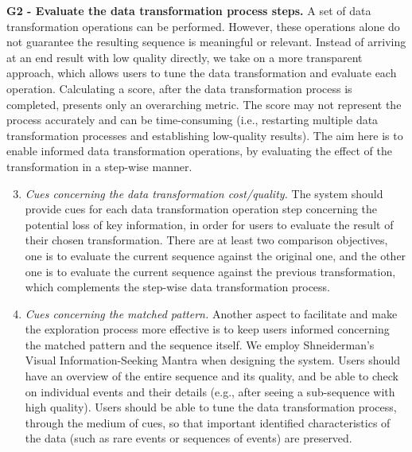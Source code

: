 \documentclass[camera]{vgtc}                          %
\begin{document}
\vspace{-4pt}
\noindent
\textbf{G2 - Evaluate the data transformation process steps.} A set of data transformation operations can be performed. However, these operations alone do not guarantee the resulting sequence is meaningful or relevant.
Instead of arriving at an end result with low quality directly, we take on a more transparent approach, which allows users to tune the data transformation and evaluate each operation. Calculating a score, after the data transformation process is completed, presents only an overarching metric. The score may not represent the process accurately and can be time-consuming (i.e., restarting multiple data transformation processes and establishing low-quality results). The aim here is to enable informed data transformation operations, by evaluating the effect of the transformation in a step-wise manner.
\begin{enumerate}
    \setcounter{enumi}{2}
    \itemsep0em
    \vspace{-4pt}
    \item \textit{Cues concerning the data transformation cost/quality.} The system should provide cues for each data transformation operation step concerning the potential loss of key information, in order for users to evaluate the result of their chosen transformation. There are at least two comparison objectives, one is to evaluate the current sequence against the original one, and the other one is to evaluate the current sequence against the previous transformation, which complements the step-wise data transformation process.
    
    \vspace{-4pt}
    \item \textit{Cues concerning the matched pattern.} Another aspect to facilitate and make the exploration process more effective is to keep users informed concerning the matched pattern and the sequence itself. We employ Shneiderman's Visual Information-Seeking Mantra \cite{Shneiderman1996The} when designing the system.
    Users should have an overview of the entire sequence and its quality, and be able to check on individual events and their details (e.g., after seeing a sub-sequence with high quality). Users should be able to tune the data transformation process, through the medium of cues, so that important identified characteristics of the data (such as rare events or sequences of events) are preserved.
\end{enumerate}
\end{document}
